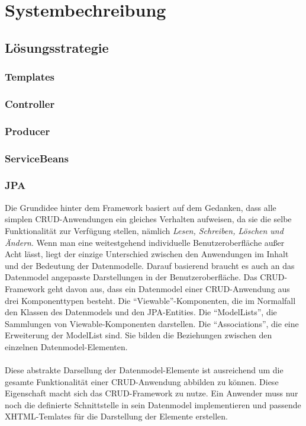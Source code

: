 \chapter{Systembechreibung}

\section{Lösungsstrategie}

\subsection{Templates}


\subsection{Controller}

\subsection{Producer}

\subsection{ServiceBeans}

\subsection{JPA}





Die Grundidee hinter dem Framework basiert auf dem Gedanken, dass alle simplen \acs{CRUD}-Anwendungen ein gleiches Verhalten aufweisen, da sie die selbe Funktionalität
zur Verfügung stellen, nämlich \textit{Lesen, Schreiben, Löschen und Ändern}.
Wenn man eine weitestgehend individuelle Benutzeroberfläche außer Acht lässt, liegt der einzige Unterschied zwischen den Anwendungen im Inhalt und der Bedeutung der Datenmodelle.
Darauf basierend braucht es auch an das Datenmodel angepasste Darstellungen in der Benutzeroberfläche.
Das CRUD-Framework geht davon aus, dass ein Datenmodel einer \acs{CRUD}-Anwendung aus drei Komponenttypen besteht. 
Die \enquote{Viewable}-Komponenten, die im Normalfall den Klassen des Datenmodels und den JPA-Entities. 
Die \enquote{ModelLists}, die Sammlungen von Viewable-Komponenten darstellen. 
Die \enquote{Associations}, die eine Erweiterung der ModelList sind. Sie bilden die Beziehungen zwischen den einzelnen Datenmodel-Elementen.\\
\\
Diese abstrakte Darsellung der Datenmodel-Elemente ist ausreichend um die gesamte Funktionalität einer CRUD-Anwendung abbilden zu
können. Diese Eigenschaft macht sich das \acs{CRUD}-Framework zu nutze. Ein Anwender muss nur noch die definierte Schnittstelle in sein Datenmodel implementieren und 
passende XHTML-Temlates für die Darstellung der Elemente erstellen.


